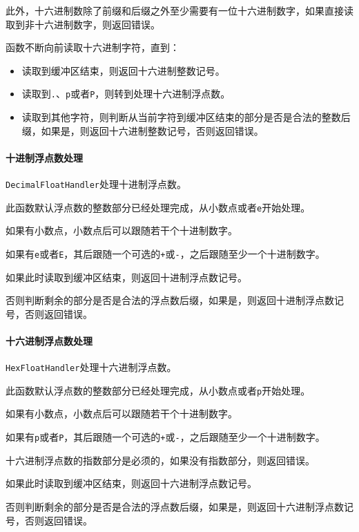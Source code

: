 \documentclass[lang=cn,11pt,a4paper,cite=authornum]{paper}
\begin{document}
此外，十六进制数除了前缀和后缀之外至少需要有一位十六进制数字，如果直接读取到非十六进制数字，则返回错误。

函数不断向前读取十六进制字符，直到：

\begin{itemize}
    \item 读取到缓冲区结束，则返回十六进制整数记号。
    \item 读取到\texttt{.}、\texttt{p}或者\texttt{P}，则转到处理十六进制浮点数。
    \item 读取到其他字符，则判断从当前字符到缓冲区结束的部分是否是合法的整数后缀，如果是，则返回十六进制整数记号，否则返回错误。
\end{itemize}

\paragraph{十进制浮点数处理} \texttt{DecimalFloatHandler}处理十进制浮点数。

此函数默认浮点数的整数部分已经处理完成，从小数点或者\texttt{e}开始处理。

如果有小数点，小数点后可以跟随若干个十进制数字。

如果有\texttt{e}或者\texttt{E}，其后跟随一个可选的\texttt{+}或\texttt{-}，之后跟随至少一个十进制数字。

如果此时读取到缓冲区结束，则返回十进制浮点数记号。

否则判断剩余的部分是否是合法的浮点数后缀，如果是，则返回十进制浮点数记号，否则返回错误。

\paragraph{十六进制浮点数处理} \texttt{HexFloatHandler}处理十六进制浮点数。

此函数默认浮点数的整数部分已经处理完成，从小数点或者\texttt{p}开始处理。

如果有小数点，小数点后可以跟随若干个十进制数字。

如果有\texttt{p}或者\texttt{P}，其后跟随一个可选的\texttt{+}或\texttt{-}，之后跟随至少一个十进制数字。

十六进制浮点数的指数部分是必须的，如果没有指数部分，则返回错误。

如果此时读取到缓冲区结束，则返回十六进制浮点数记号。

否则判断剩余的部分是否是合法的浮点数后缀，如果是，则返回十六进制浮点数记号，否则返回错误。
\end{document}
